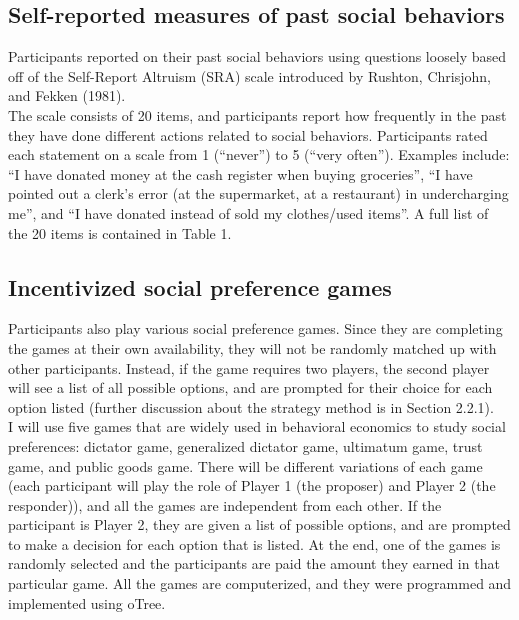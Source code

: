 \documentclass{article}
\begin{document}
\subsection{Self-reported measures of past social behaviors}

Participants reported on their past social behaviors using questions loosely based off of the Self-Report Altruism (SRA) scale introduced by Rushton, Chrisjohn, and Fekken (1981). \\

The scale consists of 20 items, and participants report how frequently in the past they have done different actions related to social behaviors. Participants rated each statement on a scale from 1 (``never'') to 5 (``very often''). Examples include: ``I have donated money at the cash register when buying groceries'', ``I have pointed out a clerk\rq s error (at the supermarket, at a restaurant) in undercharging me'', and ``I have donated instead of sold my clothes/used items''. A full list of the 20 items is contained in Table 1. \\

\subsection{Incentivized social preference games}

Participants also play various social preference games. Since they are completing the games at their own availability, they will not be randomly matched up with other participants. Instead, if the game requires two players, the second player will see a list of all possible options, and are prompted for their choice for each option listed (further discussion about the strategy method is in Section 2.2.1). \\

I will use five games that are widely used in behavioral economics to study social preferences: dictator game, generalized dictator game, ultimatum game, trust game, and public goods game. There will be different variations of each game (each participant will play the role of Player 1 (the proposer) and Player 2 (the responder)), and all the games are independent from each other. If the participant is Player 2, they are given a list of possible options, and are prompted to make a decision for each option that is listed. At the end, one of the games is randomly selected and the participants are paid the amount they earned in that particular game. All the games are computerized, and they were programmed and implemented using oTree. \\
\end{document}
